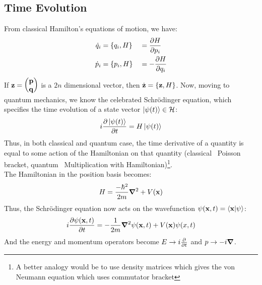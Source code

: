\subsection{Time Evolution}
From classical Hamilton's equations of motion, we have:
\begin{alignat*}{3}
    \dot{q}_i &= \{q_i,H\} &&= \pdv{H}{p_i}  \\
    \dot{p}_i &= \{p_i,H\} &&= -\pdv{H}{q_i}
\end{alignat*}
If $\vb{z} = \mqty(\vb{p}\\\vb{q})$ is a $2n$ dimensional vector, then $\dot{\vb{z}} = \{\vb{z},H\}$. Now, moving to quantum mechanics, we know the celebrated Schr\"odinger equation, which specifies the time evolution of a state vector $\ket{\psi(t)}\in \mathcal H$:
$$i \pdv{\ket{\psi(t)}}{t} = H\ket{\psi(t)}$$
Thus, in both classical and quantum case, the time derivative of a quantity is equal to some action of the Hamiltonian on that quantity (classical \rightarrow \ Poisson bracket, quantum \rightarrow \ Multiplication with Hamiltonian)\footnote{A better analogy would be to use density matrices which gives the von Neumann equation which uses commutator bracket}. \\[0.2cm]
The Hamiltonian in the position basis becomes: $$H = \frac{-\hbar^2}{2m}\grad^2 + V(\vb{x})$$
Thus, the Schr\"odinger equation now acts on the wavefunction $\psi(\vb{x},t) = \braket{\vb{x}|\psi}$:
$$i \pdv{\psi(\vb{x},t)}{t} = -\frac{1}{2m}\grad^2 \psi(\vb{x},t) + V(\vb{x})\psi(x,t)$$
And the energy and momentum operators become $E\rightarrow i \pdv{t}$ and $p\rightarrow -i \grad$.
